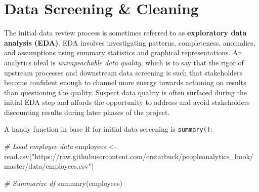 \documentclass[
]{book}
\newenvironment{Shaded}{\begin{snugshade}}{\end{snugshade}}
\newcommand{\CommentTok}[1]{\textcolor[rgb]{0.56,0.35,0.01}{\textit{#1}}}
\newcommand{\FunctionTok}[1]{\textcolor[rgb]{0.00,0.00,0.00}{#1}}
\newcommand{\NormalTok}[1]{#1}
\newcommand{\OtherTok}[1]{\textcolor[rgb]{0.56,0.35,0.01}{#1}}
\newcommand{\StringTok}[1]{\textcolor[rgb]{0.31,0.60,0.02}{#1}}
\begin{document}
\hypertarget{data-screening-cleaning}{%
\section{Data Screening \& Cleaning}\label{data-screening-cleaning}}

The initial data review process is sometimes referred to as \textbf{exploratory data analysis (EDA)}. EDA involves investigating patterns, completeness, anomalies, and assumptions using summary statistics and graphical representations. An analytics ideal is \emph{unimpeachable data quality}, which is to say that the rigor of upstream processes and downstream data screening is such that stakeholders become confident enough to channel more energy towards actioning on results than questioning the quality. Suspect data quality is often surfaced during the initial EDA step and affords the opportunity to address and avoid stakeholders discounting results during later phases of the project.

A handy function in base R for initial data screening is \texttt{summary()}:

\begin{Shaded}
\begin{Highlighting}[]
\CommentTok{\# Load employee data}
\NormalTok{employees }\OtherTok{\textless{}{-}} \FunctionTok{read.csv}\NormalTok{(}\StringTok{"https://raw.githubusercontent.com/crstarbuck/peopleanalytics\_book/master/data/employees.csv"}\NormalTok{)}

\CommentTok{\# Summarize df}
\FunctionTok{summary}\NormalTok{(employees)}
\end{Highlighting}
\end{Shaded}
\end{document}
